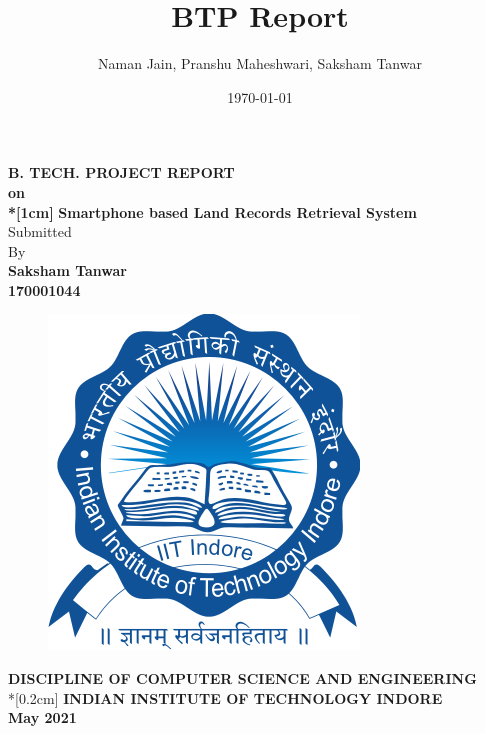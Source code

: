 \documentclass[12pt]{article}
\title{BTP Report}
\author{Naman Jain, Pranshu Maheshwari, Saksham Tanwar}
\date{\today}
\newcommand{\mainauth}{Saksham Tanwar}
\newcommand{\roll}{170001044}
\newenvironment{changemargin}[2]{%
\begin{list}{}{%
\setlength{\topsep}{0pt}%
\setlength{\leftmargin}{#1}%
\setlength{\rightmargin}{#2}%
\setlength{\listparindent}{\parindent}%
\setlength{\itemindent}{\parindent}%
\setlength{\parsep}{\parskip}%
}%
\item[]}{\end{list}}
\begin{document}

\renewcommand*{\acronymname}{Abbreviations}

\begin{titlepage}
    \begin{changemargin}{-2cm}{-2cm}
        \begin{center}
            \textbf{\Huge{B. TECH. PROJECT REPORT}\\}
            \textbf{\Huge{on}\\*[1cm]}
            \textbf{\Huge{Smartphone based Land Records Retrieval System}\\}
            \vspace{1cm}
            Submitted\\
            By\\
            \textbf{\mainauth}\\
            \textbf{\roll}\\
            \vspace{2cm}

            \begin{figure}[H]
                \includegraphics[scale=0.5]{iiti_logo}
                \centering
            \end{figure}
            \vspace{2.5cm}
            \textbf{\large{DISCIPLINE OF COMPUTER SCIENCE AND ENGINEERING}}\\*[0.2cm]
            \textbf{\LARGE{INDIAN INSTITUTE OF TECHNOLOGY INDORE}}\\
            \textbf{\large{May 2021}}
        \end{center}
    \end{changemargin}
\end{titlepage}
\clearpage
\end{document}
